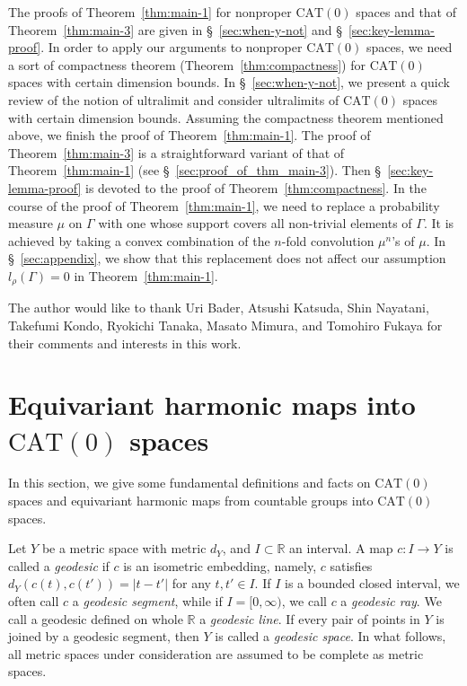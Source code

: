 \documentclass[12pt]{amsart}
\numberwithin{equation}{section}
\theoremstyle{plain}
\theoremstyle{definition}
\theoremstyle{remark}
\newcommand{\R}{{\mathbb R}}
\newcommand{\cat}[1]{\mathrm{CAT}(#1)}
\newcommand{\ray}[1]{[#1)}
\begin{document}
The proofs of Theorem~\ref{thm:main-1} for nonproper $\cat{0}$ spaces
and that of Theorem~\ref{thm:main-3} are given in
\S~\ref{sec:when-y-not} and \S~\ref{sec:key-lemma-proof}. 
In order to apply our arguments to nonproper $\cat{0}$ spaces, we need a
sort of compactness theorem (Theorem~\ref{thm:compactness}) for
$\cat{0}$ spaces with certain dimension bounds. 
In \S~\ref{sec:when-y-not}, we present a quick review of the notion of
ultralimit and consider ultralimits of $\cat{0}$ spaces with certain
dimension bounds.  
Assuming the compactness theorem mentioned above, 
we finish the proof of Theorem~\ref{thm:main-1}. 
The proof of Theorem~\ref{thm:main-3} is a straightforward variant of
that of Theorem~\ref{thm:main-1} 
(see \S~\ref{sec:proof_of_thm_main-3}). 
Then \S~\ref{sec:key-lemma-proof} is devoted to the proof of
Theorem~\ref{thm:compactness}. 
In the course of the proof of Theorem~\ref{thm:main-1}, we need to
replace a probability measure $\mu$ on $\Gamma$ with one whose support
covers all non-trivial elements of $\Gamma$. 
It is achieved by taking a convex combination of the $n$-fold
convolution $\mu^n$'s of $\mu$. 
In \S~\ref{sec:appendix}, we show that this replacement does not affect
our assumption $l_{\rho}(\Gamma)=0$ in Theorem~\ref{thm:main-1}. 

The author would like to thank Uri Bader, Atsushi Katsuda, Shin
Nayatani, Takefumi Kondo, Ryokichi Tanaka, Masato Mimura, and Tomohiro
Fukaya for their comments and interests in this work. 

\section{Equivariant harmonic maps into $\cat{0}$ spaces}
\label{sec:harmonic_maps}

%
%
In this section, we give some fundamental definitions and
facts on $\cat{0}$ spaces and equivariant harmonic maps from 
countable groups into $\cat{0}$ spaces. 

Let $Y$ be a metric space with metric $d_Y$, and $I\subset \R$ an
interval. 
A map $c\colon I \rightarrow Y$ is called a {\it geodesic} if $c$ is
an isometric embedding, namely, $c$ satisfies $d_Y(c(t),c(t'))=|t-t'|$
for any $t,t' \in I$. 
If $I$ is a bounded closed interval, we often call $c$ a 
{\it geodesic segment}, while if $I=\ray{0,\infty}$, we call $c$ a 
{\it geodesic ray}.  
We call a geodesic defined on whole $\R$ a {\it geodesic line}. 
If every pair of points in $Y$ is joined by a geodesic segment, then $Y$
is called a {\it geodesic space}. 
In what follows, all metric spaces under consideration are assumed to be
complete as metric spaces. 
\end{document}
